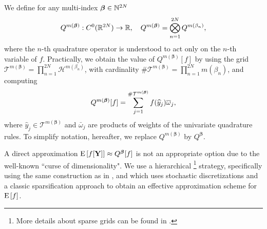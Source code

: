 We define for any multi-index $\boldsymbol{\beta} \in \mathbb{N}^{2N}$
$$Q^{m(\boldsymbol{\beta})}: C^0(\mathbb{R}^{2N}) \rightarrow \mathbb{R},\quad  Q^{m(\boldsymbol{\beta})}= \bigotimes_{n = 1}^{2N} Q^{m(\beta_n)} , $$
where the $n$-th quadrature operator is understood to act only on the $n$-th variable of $f$. Practically, we obtain the value of $Q^{m(\boldsymbol{\beta})}[f]$  by using the grid $\mathcal{T}^{m(\boldsymbol{\beta})}= \prod_{n = 1}^{2N}  \mathcal{H}^{m(\beta_n)}$, with cardinality $\#\mathcal{T}^{m(\boldsymbol{\beta})}=\prod_{n=1}^{2N} m (\beta_n)$, and computing
$$ Q^{m(\boldsymbol{\beta})}[f]= \sum_{j=1}^{\#\mathcal{T}^{m(\boldsymbol{\beta})}} f(\widehat{y}_j) \overline{\omega}_j ,$$
where $\hat{y}_j \in \mathcal{T}^{m(\boldsymbol{\beta})}$ and $\bar{\omega}_j$ are  products of weights of the univariate quadrature rules. To simplify notation, hereafter, we replace  $Q^{m(\boldsymbol{\beta})}$ by $Q^{\boldsymbol{\beta}}$.

A direct approximation $\mathrm{E}\left[f[\mathbf{Y}]\right] \approx Q^{\boldsymbol{\beta}}[f]$ is not an appropriate option  due to the well-known ``curse of dimensionality". We use  a hierarchical \footnote{More details about sparse grids can be found in \cite{bungartz2004sparse}.} strategy, specifically using the same
construction as in \cite{haji2016multi}, and which uses  stochastic discretizations  and a classic sparsification approach to obtain an effective approximation scheme for $\mathrm{E}\left[f\right]$. 

